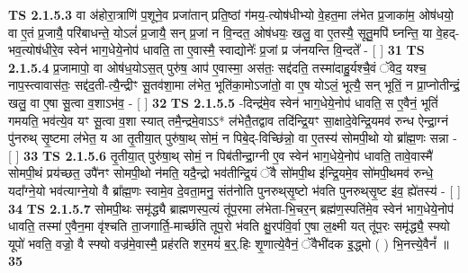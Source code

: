 \documentclass[17pt]{extarticle}
\begin{document}
                  \newline
                                \textbf{ TS 2.1.5.3} \newline
                  वा अ॑होरा॒त्राणि॑ प॒शूने॒व प्रजा॑तान् प्रति॒ष्ठां ग॑मय॒-त्योष॑धीभ्यो वे॒हत॒मा ल॑भेत प्र॒जाका॑म॒ ओष॑धयो॒ वा ए॒तं प्र॒जायै॒ परि॑बाधन्ते॒ योऽलं॑ प्र॒जायै॒ सन् प्र॒जां न वि॒न्दत॒ ओष॑धयः॒ खलु॒ वा ए॒तस्यै॒ सूतु॒मपि॑ घ्नन्ति॒ या वे॒हद्-भव॒त्योष॑धीरे॒व स्वेन॑ भाग॒धेये॒नोप॑ धावति॒ ता ए॒वास्मै॒ स्वाद्योनेः᳚ प्र॒जां प्र ज॑नयन्ति वि॒न्दते᳚ - [  ] \textbf{  31} \newline
                  \newline
                                \textbf{ TS 2.1.5.4} \newline
                  प्र॒जामापो॒ वा ओष॑ध॒योऽस॒त् पुरु॑ष॒ आप॑ ए॒वास्मा॒ अस॑तः॒ सद्द॑दति॒ तस्मा॑दाहु॒र्यश्चै॒वं ॅवेद॒ यश्च॒ नाप॒स्त्वावास॑तः॒ सद्द॑द॒ती-त्यै॒न्द्रीꣳ सू॒तव॑शा॒मा ल॑भेत॒ भूति॑का॒मोऽजा॑तो॒ वा ए॒ष योऽलं॒ भूत्यै॒ सन् भूतिं॒ न प्रा॒प्नोतीन्द्रं॒ खलु॒ वा ए॒षा सू॒त्वा व॒शाऽभ॑व॒ - [  ] \textbf{  32} \newline
                  \newline
                                \textbf{ TS 2.1.5.5} \newline
                  -दिन्द्र॑मे॒व स्वेन॑ भाग॒धेये॒नोप॑ धावति॒ स ए॒वैनं॒ भूतिं॑ गमयति॒ भव॑त्ये॒व यꣳ सू॒त्वा व॒शा स्यात् तमै॒न्द्रमे॒वाऽऽ* ल॑भेतै॒तद्वाव तदि॑न्द्रि॒यꣳ सा॒क्षादे॒वेन्द्रि॒यमव॑ रुन्ध ऐन्द्रा॒ग्नं पु॑नरुथ् सृ॒ष्टमा ल॑भेत॒ य आ तृ॒तीया॒त् पुरु॑षा॒थ् सोमं॒ न पिबे॒द्-विच्छि॑न्नो॒ वा ए॒तस्य॑ सोमपी॒थो यो ब्रा᳚ह्म॒णः सन्ना - [  ] \textbf{  33} \newline
                  \newline
                                \textbf{ TS 2.1.5.6} \newline
                  तृ॒तीया॒त् पुरु॑षा॒थ् सोमं॒ न पिब॑तीन्द्रा॒ग्नी ए॒व स्वेन॑ भाग॒धेये॒नोप॑ धावति॒ तावे॒वास्मै॑ सोमपी॒थं प्रय॑च्छत॒ उपै॑नꣳ सोमपी॒थो न॑मति॒ यदै॒न्द्रो भव॑तीन्द्रि॒यं ॅवै सो॑मपी॒थ इ॑न्द्रि॒यमे॒व सो॑मपी॒थमव॑ रुन्धे॒ यदा᳚ग्ने॒यो भव॑त्याग्ने॒यो वै ब्रा᳚ह्म॒णः स्वामे॒व दे॒वता॒मनु॒ संत॑नोति पुनरुथ्‌सृ॒ष्टो भ॑वति पुनरुथ्‌सृ॒ष्ट इ॑व॒ ह्ये॑तस्य॑ - [  ] \textbf{  34} \newline
                  \newline
                                \textbf{ TS 2.1.5.7} \newline
                  सोमपी॒थः समृ॑द्ध्यै ब्राह्मणस्प॒त्यं तू॑प॒रमा ल॑भेता-भि॒चर॒न् ब्रह्म॑ण॒स्पति॑मे॒व स्वेन॑ भाग॒धेये॒नोप॑ धावति॒ तस्मा॑ ए॒वैन॒मा वृ॑श्चति ता॒जगार्ति॒-मार्च्छ॑ति तूप॒रो भ॑वति क्षु॒रप॑वि॒र्वा ए॒षा ल॒क्ष्मी यत् तू॑प॒रः समृ॑द्ध्यै॒ स्फ्यो यूपो॑ भवति॒ वज्रो॒ वै स्फ्यो वज्र॑मे॒वास्मै॒ प्रह॑रति शर॒मयं॑ ब॒र्॒.हिः शृ॒णात्ये॒वैनं॒ ॅवैभी॑दक इ॒द्ध्मो ( ) भि॒नत्त्ये॒वैनं᳚ ॥ \textbf{  35} \newline
\end{document}
